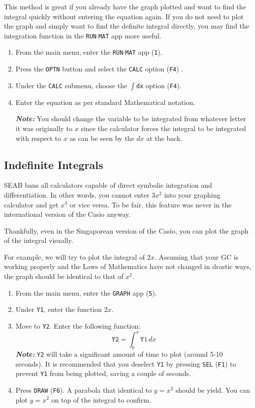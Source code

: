 \documentclass[a5paper]{memoir}
\def\code#1{\texttt{#1}}
\def\note#1{\textcolor[HTML]{109fa9}{\textbf{\textit{Note:}}} #1}
\def\runmat{\code{RUN$\cdot$MAT} }
\def\Fone{(\code{F1}) }
\def\Ffour{(\code{F4}) }
\def\fsix{(\code{F6})}
\begin{document}
This method is great if you already have the graph plotted and want to find the integral quickly without entering the equation again. If you do not need to plot the graph and simply want to find the definite integral directly, you may find the integration function in the \runmat app more useful.

\begin{enumerate}
	\item From the main menu, enter the \runmat app (\code{1}).
	\item Press the \code{OPTN} button and select the \code{CALC} option \Ffour.
	\item Under the \code{CALC} submenu, choose the \code{$\int$dx} option (\code{F4}).
	\item Enter the equation as per standard Mathematical notation. 
	
	\note{You should change the variable to be integrated from whatever letter it was originally to $x$ since the calculator forces the integral to be integrated with respect to $x$ as can be seen by the $dx$ at the back.}
\end{enumerate}

\subsection{Indefinite Integrals}
SEAB bans all calculators capable of direct symbolic integration and differentiation. In other words, you cannot enter $3x^2$ into your graphing calculator and get $x^3$ or vice versa. To be fair, this feature was never in the international version of the Casio anyway.

Thankfully, even in the Singaporean version of the Casio, you can plot the graph of the integral visually.

For example, we will try to plot the integral of $2x$. Assuming that your GC is working properly and the Laws of Mathematics have not changed in drastic ways, the graph should be identical to that of $x^2$.

\begin{enumerate}
	\item From the main menu, enter the \code{GRAPH} app (\code{5}).
	\item Under \code{Y1}, enter the function $2x$.
	\item Move to \code{Y2}. Enter the following function:
	\begin{equation*}
	\code{Y2}=\int_{0}^{x} \code{Y}1 \, dx
	\end{equation*}
	\note{\code{Y2} will take a significant amount of time to plot (around 5-10 seconds). It is recommended that you deselect \code{Y1} by pressing \code{SEL} \Fone to prevent \code{Y1} from being plotted, saving a couple of seconds.}
	\item Press \code{DRAW} \fsix. A parabola that identical to $y=x^2$ should be yield. You can plot $y=x^2$ on top of the integral to confirm.
\end{enumerate}
\end{document}

